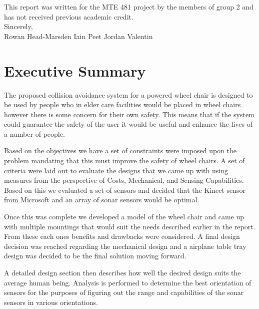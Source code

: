 \documentclass[oneside,final,a4paper]{report}
\begin{document}
This report was written for the MTE 481 project by the members of group 2 and has not received previous academic credit. \\[0.5cm]

Sincerely, \\[1cm]

Rowan Head-Marsden \hspace {1.5cm} Iain Peet \hspace{1.5cm} Jordan Valentin
\clearpage

\pagestyle{plain}
\setcounter{page}{1}

\setcounter{tocdepth}{1}
\tableofcontents

\listoffigures
{}

\chapter*{Executive Summary}
The proposed collision avoidance system for a powered wheel chair is designed to be used by people who in elder care facilities would be placed in wheel chairs however there is some concern for their own safety. This means that if the system could guarantee the safety of the user it would be useful and enhance the lives of a number of people. 

Based on the objectives we have a set of constraints were imposed upon the problem mandating that this must improve the safety of wheel chairs. A set of criteria were laid out to evaluate the designs that we came up with using measures from the perspective of Costs, Mechanical, and Sensing Capabilities. Based on this we evaluated a set of sensors and decided that the Kinect sensor from Microsoft and an array of sonar sensors would be optimal.

Once this was complete we developed a model of the wheel chair and came up with multiple mountings that would suit the needs described earlier in the report. From these each ones benefits and drawbacks were considered. A final design decision was reached regarding the mechanical design and a airplane table tray design was decided to be the final solution moving forward.

 A detailed design section then describes how well the desired design suits the average human being. Analysis is performed to determine the best orientation of sensors for the purposes of figuring out the range and capabilities of the sonar sensors in various orientations. 
\end{document}

